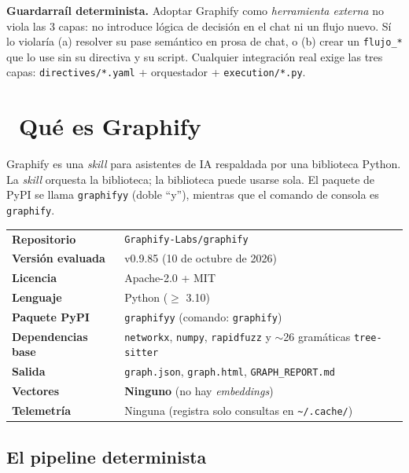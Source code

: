 \documentclass[11pt,a4paper]{article}
\newcommand{\iconotexto}[2]{\textcolor{cyanNeon}{\faIcon{#1}}~#2}
\begin{document}
\begin{cajaRecuerda}
\textbf{Guardarraíl determinista.} Adoptar Graphify como \emph{herramienta externa} no
viola las 3 capas: no introduce lógica de decisión en el chat ni un flujo nuevo. Sí lo
violaría (a) resolver su pase semántico en prosa de chat, o (b) crear un
\texttt{flujo\_*} que lo use sin su directiva y su script. Cualquier integración real
exige las tres capas: \texttt{directives/*.yaml} + orquestador + \texttt{execution/*.py}.
\end{cajaRecuerda}

\section[Qué es Graphify]{\iconotexto{sitemap}{Qué es Graphify}}

Graphify es una \emph{skill} para asistentes de IA respaldada por una biblioteca Python.
La \emph{skill} orquesta la biblioteca; la biblioteca puede usarse sola. El paquete de
PyPI se llama \texttt{graphifyy} (doble ``y''), mientras que el comando de consola es
\texttt{graphify}.

\begin{tcolorbox}[tarjetaDato, title={\faIcon{project-diagram}~Ficha de la herramienta}]
\begin{tabular}{ll}
\toprule
\textbf{Repositorio} & \texttt{Graphify-Labs/graphify} \\
\textbf{Versión evaluada} & v0.9.85 (10 de octubre de 2026) \\
\textbf{Licencia} & Apache-2.0 + MIT \\
\textbf{Lenguaje} & Python (\(\ge\) 3.10) \\
\textbf{Paquete PyPI} & \texttt{graphifyy} (comando: \texttt{graphify}) \\
\textbf{Dependencias base} & \texttt{networkx}, \texttt{numpy}, \texttt{rapidfuzz} y \(\sim\)26 gramáticas \texttt{tree-sitter} \\
\textbf{Salida} & \texttt{graph.json}, \texttt{graph.html}, \texttt{GRAPH\_REPORT.md} \\
\textbf{Vectores} & \textbf{Ninguno} (no hay \emph{embeddings}) \\
\textbf{Telemetría} & Ninguna (registra solo consultas en \texttt{\textasciitilde/.cache/}) \\
\bottomrule
\end{tabular}
\end{tcolorbox}

\subsection{El pipeline determinista}
\end{document}
